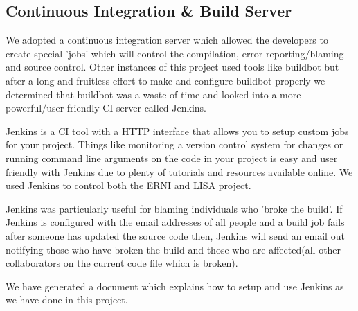 \subsection{Continuous Integration \& Build Server}

We adopted a continuous integration server which allowed the developers to create special 'jobs' which will control the compilation, error reporting/blaming and source control. Other instances of this project used tools like buildbot but after a long and fruitless effort to make and configure buildbot properly we determined that buildbot was a waste of time and looked into a more powerful/user friendly CI server called Jenkins. 

Jenkins is a CI tool with a HTTP interface that allows you to setup custom jobs for your project. Things like monitoring a version control system for changes or running command line arguments on the code in your project is easy and user friendly with Jenkins due to plenty of tutorials and resources available online. We used Jenkins to control both the ERNI and LISA project. 

Jenkins was particularly useful for blaming individuals who 'broke the build'. If Jenkins is configured with the email addresses of all people and a build job fails after someone has updated the source code then, Jenkins will send an email out notifying those who have broken the build and those who are affected(all other collaborators on the current code file which is broken).

We have generated a document which explains how to setup and use Jenkins as we have done in this project. 
